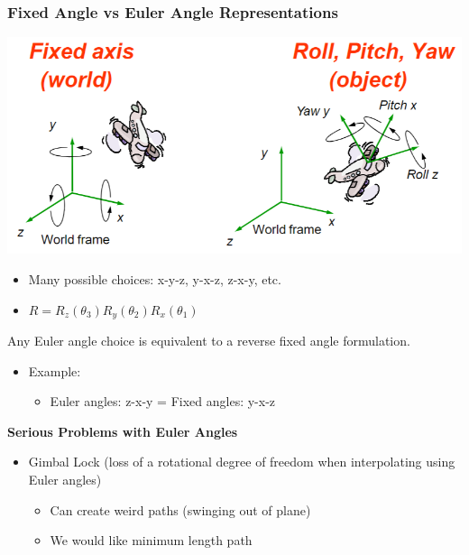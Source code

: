 \documentclass{article}
\begin{document}
\subsubsection*{Fixed Angle vs Euler Angle Representations}
\begin{center}
    \includegraphics*[scale=0.8]{W2_5.png}
\end{center}
\begin{itemize}
    \item Many possible choices: x-y-z, y-x-z, z-x-y, etc.
    \item $R = R_z(\theta_3)R_y(\theta_2)R_x(\theta_1)$
\end{itemize}
Any Euler angle choice is equivalent to a reverse fixed angle formulation.
\begin{itemize}
    \item Example:
    \begin{itemize}
        \item Euler angles: z-x-y = Fixed angles: y-x-z
    \end{itemize}
\end{itemize}
\textbf{Serious Problems with Euler Angles}
\begin{itemize}
    \item Gimbal Lock (loss of a rotational degree of freedom when interpolating using Euler angles)
    \begin{itemize}
        \item Can create weird paths (swinging out of plane)
        \item We would like minimum length path
    \end{itemize}
\end{itemize}
\end{document}
